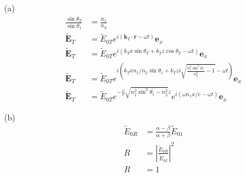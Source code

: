 (a)\begin{align*}
    \frac{\sin\theta_T}{\sin\theta_1}&=\frac{n_1}{n_2}\\
    \widetilde{\boldsymbol{E}}_T &= \widetilde{E}_{0T}e^{i(\boldsymbol k_T\cdot\boldsymbol r-\omega t)}\boldsymbol{e}_x\\
    \widetilde{\boldsymbol{E}}_T &= \widetilde{E}_{0T}e^{i(k_Tx\sin\theta_T+k_Tz\cos\theta_T-\omega t)}\boldsymbol{e}_x\\
    \widetilde{\boldsymbol{E}}_T &= \widetilde{E}_{0T}e^{i(k_Txn_1/n_2\sin\theta_1+k_Tzi \sqrt{\frac{n_1^2 \sin^2\theta_1}{n_2^2} - 1}-\omega t)}\boldsymbol{e}_x\\
    \widetilde{\boldsymbol{E}}_T &= \widetilde{E}_{0T}e^{-\frac{\omega}{c}\sqrt{n_1^2\sin^2\theta_1-n_2^2}z}e^{i(\omega n_1x/c-\omega t)}\boldsymbol{e}_x
\end{align*}

(b)\begin{align*}
    \widetilde{E}_{0R}&=\frac{\alpha-\beta}{\alpha+\beta}\widetilde{E}_{01}\\
     R&= \left| \frac{\widetilde{E}_{0R}}{\widetilde{E}_{0I}} \right|^2\\
     R&=1
\end{align*}
\newpage

